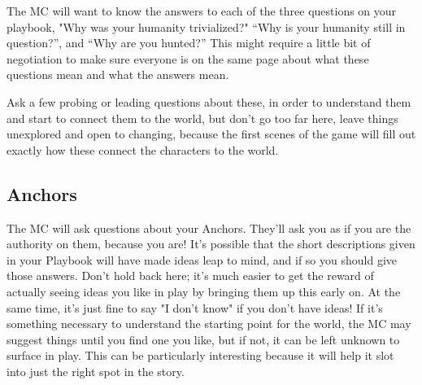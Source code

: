 \documentclass[
  oneside,
  statementpaper,
  9pt]{memoir}
\begin{document}
\begin{Player}

The MC will want to know the answers to each of the three questions on your playbook, "Why was your humanity trivialized?" “Why is your humanity still in question?”, and “Why are you hunted?” This might require a little bit of negotiation to make sure everyone is on the same page about what these questions mean and what the answers mean.

\end{Player}

\begin{MC}

Ask a few probing or leading questions about these, in order to understand them and start to connect them to the world, but don’t go too far here, leave things unexplored and open to changing, because the first scenes of the game will fill out exactly how these connect the characters to the world.

\end{MC}

\hypertarget{anchors}{%
\subsection{Anchors}\label{anchors}}

\begin{Player}

The MC will ask questions about your Anchors. They'll ask you as if you are the authority on them, because you are! It's possible that the short descriptions given in your Playbook will have made ideas leap to mind, and if so you should give those answers. Don't hold back here; it's much easier to get the reward of actually seeing ideas you like in play by bringing them up this early on. At the same time, it's just fine to say "I don't know" if you don't have ideas! If it's something necessary to understand the starting point for the world, the MC may suggest things until you find one you like, but if not, it can be left unknown to surface in play. This can be particularly interesting because it will help it slot into just the right spot in the story.

\end{Player}
\end{document}
